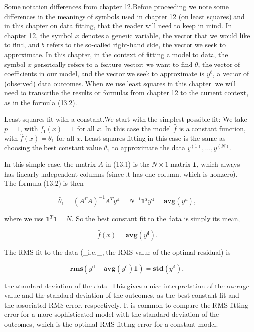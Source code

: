 Some notation differences from chapter 12.Before proceeding we note some differences in the meanings of symbols used in chapter 12 (on least squares) and in this chapter on data fitting, that the reader will need to keep in mind. In chapter 12, the symbol \(x\) denotes a generic variable, the vector that we would like to find, and \(b\) refers to the so-called right-hand side, the vector we seek to approximate. In this chapter, in the context of fitting a model to data, the symbol \(x\) generically refers to a feature vector; we want to find \(\theta\), the vector of coefficients in our model, and the vector we seek to approximate is \(y^{\mathrm{d}}\), a vector of (observed) data outcomes. When we use least squares in this chapter, we will need to transcribe the results or formulas from chapter 12 to the current context, as in the formula (13.2).

Least squares fit with a constant.We start with the simplest possible fit: We take \(p=1\), with \(f_{1}(x)=1\) for all \(x\). In this case the model \(\hat{f}\) is a constant function, with \(\hat{f}(x)=\theta_{1}\) for all \(x\). Least squares fitting in this case is the same as choosing the best constant value \(\theta_{1}\) to approximate the data \(y^{(1)},\ldots,y^{(N)}\).

In this simple case, the matrix \(A\) in (13.1) is the \(N\times 1\) matrix \(\mathbf{1}\), which always has linearly independent columns (since it has one column, which is nonzero). The formula (13.2) is then

\[\hat{\theta}_{1}=(A^{T}A)^{-1}A^{T}y^{\mathrm{d}}=N^{-1}\mathbf{1}^{T}y^{ \mathrm{d}}=\mathbf{avg}(y^{\mathrm{d}}),\]

where we use \(\mathbf{1}^{T}\mathbf{1}=N\). So the best constant fit to the data is simply its mean,

\[\hat{f}(x)=\mathbf{avg}(y^{\mathrm{d}}).\]

The RMS fit to the data (_i.e._, the RMS value of the optimal residual) is

\[\mathbf{rms}(y^{\mathrm{d}}-\mathbf{avg}(y^{\mathrm{d}})\mathbf{1})=\mathbf{ std}(y^{\mathrm{d}}),\]

the standard deviation of the data. This gives a nice interpretation of the average value and the standard deviation of the outcomes, as the best constant fit and the associated RMS error, respectively. It is common to compare the RMS fitting error for a more sophisticated model with the standard deviation of the outcomes, which is the optimal RMS fitting error for a constant model.

